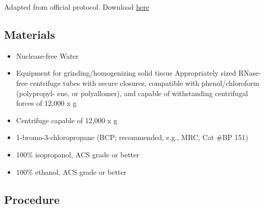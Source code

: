 \documentclass[
  letterpaper,
  DIV=11,
  numbers=noendperiod]{scrreprt}
\begin{document}

Adapted from official protocol. Download
\href{http://depts.washington.edu/kellylab/wp-content/uploads/2013/06/Tri-Reagent-Protocol.pdf}{here}

\hypertarget{materials}{%
\subsection*{\texorpdfstring{\textbf{Materials}}{Materials}}\label{materials}}

\begin{itemize}
\item
  Nuclease-free Water
\item
  Equipment for grinding/homogenizing solid tissue Appropriately sized
  RNase-free centrifuge tubes with secure closures, compatible with
  phenol/chloroform (polypropyl- ene, or polyallomer), and capable of
  withstanding centrifugal forces of 12,000 x g
\item
  Centrifuge capable of 12,000 x g
\item
  1-bromo-3-chloropropane (BCP; recommended, e.g., MRC, Cat \#BP 151)
\item
  100\% isopropanol, ACS grade or better
\item
  100\% ethanol, ACS grade or better
\end{itemize}

\hypertarget{procedure}{%
\subsection*{\texorpdfstring{\textbf{Procedure}}{Procedure}}\label{procedure}}
\end{document}
